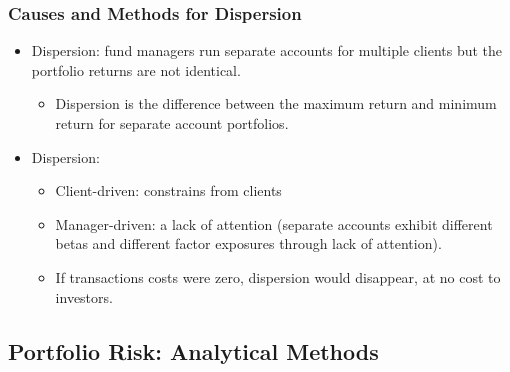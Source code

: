 \subsubsection{Causes and Methods for Dispersion}
\begin{itemize}
\item Dispersion: fund managers run separate accounts for multiple clients but the portfolio returns are not identical.
    \begin{itemize}
    \item Dispersion is the difference between the maximum return and minimum return for separate account portfolios.
    \end{itemize}
    
\item Dispersion:
    \begin{itemize}
    \item Client-driven: constrains from clients
    \item Manager-driven: a lack of attention (separate accounts exhibit different betas and different factor exposures through lack of attention).
    \item If transactions costs were zero, dispersion would disappear, at no cost to investors.
    \end{itemize}
    
\end{itemize}



\subsection{Portfolio Risk: Analytical Methods}

